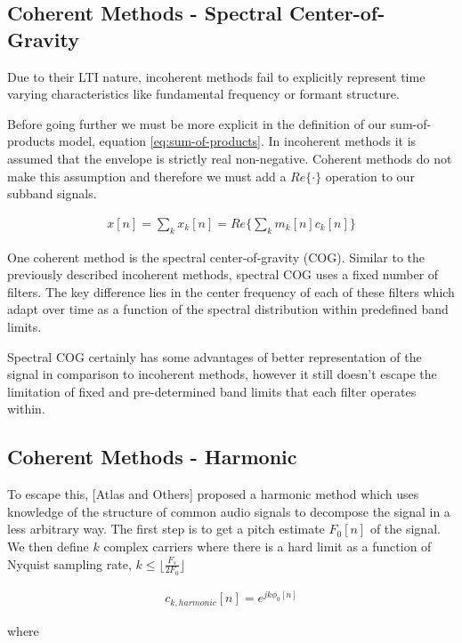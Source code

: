 \documentclass [11pt, proquest] {uwthesis}[2015/03/03]
\begin{document}
\subsection{Coherent Methods - Spectral Center-of-Gravity}

Due to their LTI nature, incoherent methods fail to explicitly represent time varying characteristics like fundamental frequency or formant structure. \cite{wilson1993design}

Before going further we must be more explicit in the definition of our sum-of-products model, equation \ref{eq:sum-of-products}.  In incoherent methods it is assumed that the envelope is strictly real non-negative.  Coherent methods do not make this assumption and therefore we must add a $Re\{\cdot\}$ operation to our subband signals.

\begin{align}
x[n] = \sum\limits_k x_k[n] = Re\bigg\{ \sum\limits_k m_k[n] c_k[n] \bigg\}
\end{align}

One coherent method is the spectral center-of-gravity (COG).  Similar to the previously described incoherent methods, spectral COG uses a fixed number of filters.  The key difference lies in the center frequency of each of these filters which adapt over time as a function of the spectral distribution within predefined band limits.

Spectral COG certainly has some advantages of better representation of the signal in comparison to incoherent methods, however it still doesn't escape the limitation of fixed and pre-determined band limits that each filter operates within.

\subsection{Coherent Methods - Harmonic}

To escape this, [Atlas and Others] proposed a harmonic method which uses knowledge of the structure of common audio signals to decompose the signal in a less arbitrary way.  The first step is to get a pitch estimate $F_0[n]$ of the signal.  We then define $k$ complex carriers where there is a hard limit as a function of Nyquist sampling rate, $k \leq  \lfloor \frac{F_s}{2F_0} \rfloor$

\begin{align}
c_{k,harmonic}[n] = e^{jk\phi_0 [n]}
\end{align}

where 
\end{document}
